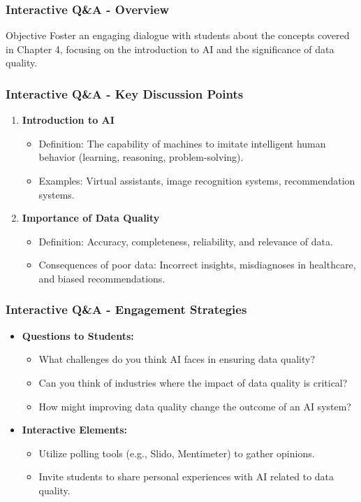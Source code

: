 \documentclass[aspectratio=169]{beamer}
\begin{document}
\begin{frame}[fragile]
    \frametitle{Interactive Q\&A - Overview}
    \begin{block}{Objective}
        Foster an engaging dialogue with students about the concepts covered in Chapter 4, focusing on the introduction to AI and the significance of data quality.
    \end{block}
\end{frame}

\begin{frame}[fragile]
    \frametitle{Interactive Q\&A - Key Discussion Points}
    \begin{enumerate}
        \item \textbf{Introduction to AI}
            \begin{itemize}
                \item Definition: The capability of machines to imitate intelligent human behavior (learning, reasoning, problem-solving).
                \item Examples: Virtual assistants, image recognition systems, recommendation systems.
            \end{itemize}
        \item \textbf{Importance of Data Quality}
            \begin{itemize}
                \item Definition: Accuracy, completeness, reliability, and relevance of data.
                \item Consequences of poor data: Incorrect insights, misdiagnoses in healthcare, and biased recommendations.
            \end{itemize}
    \end{enumerate}
\end{frame}

\begin{frame}[fragile]
    \frametitle{Interactive Q\&A - Engagement Strategies}
    \begin{itemize}
        \item \textbf{Questions to Students:}
            \begin{itemize}
                \item What challenges do you think AI faces in ensuring data quality?
                \item Can you think of industries where the impact of data quality is critical?
                \item How might improving data quality change the outcome of an AI system?
            \end{itemize}
        \item \textbf{Interactive Elements:}
            \begin{itemize}
                \item Utilize polling tools (e.g., Slido, Mentimeter) to gather opinions.
                \item Invite students to share personal experiences with AI related to data quality.
            \end{itemize}
    \end{itemize}
\end{frame}
\end{document}
